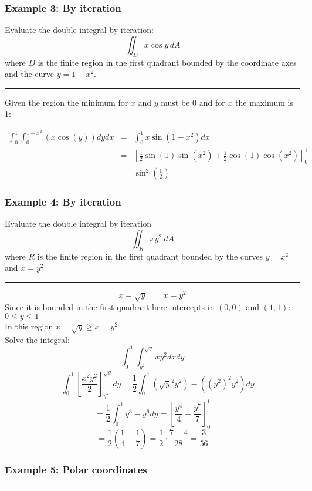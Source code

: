 \subsubsection{Example 3: By iteration}
Evaluate the double integral by iteration:
$$\iint_{D}x\cos y\,d A$$
where $D$ is the finite region in the first quadrant bounded by the coordinate axes and the curve
$y=1-x^2$.

\rule{\textwidth}{1pt}

Given the region the minimum for $x$ and $y$ must be $0$ and for $x$ the maximum is 1:

\begin{eqnarray*}
  \int_{0}^{1}\int_{0}^{1-x^2}(x\cos(y))dydx&=&\int_{0}^{1}x \sin \left(1-x^2\right)dx\\
                                            &=&\left[\frac{1}{2} \sin (1) \sin \left(x^2\right)+\frac{1}{2} \cos (1) \cos \left(x^2\right)\right]^1_0\\
                                            &=&\boxed{\sin ^2\left(\frac{1}{2}\right)}
\end{eqnarray*}

\subsubsection{Example 4: By iteration}
Evaluate the double integral by iteration
$$\iint_Rxy^2\ dA$$
where $R$ is the finite region in the first quadrant bounded by the curves $y=x^2$ and $x=y^2$

\rule{\textwidth}{1pt}
$$x=\sqrt{y}\qquad x=y^2$$
Since it is bounded in the first quadrant here intercepts in $(0,0)$ and $(1,1)$: $0\leq y\leq 1$\\
In this region $x=\sqrt{y}\geq x=y^2$\\
Solve the integral:
$$\int_0^1\int_{y^2}^{\sqrt{y}}xy^2 dxdy$$
$$=\int_0^1 \left[\frac{x^2y^2}{2}\right]_{y^2}^{\sqrt{y}}dy=\frac{1}{2}\int_0^1 (\sqrt{y}^2y^2)-((y^2)^2y^2)dy$$
$$=\frac{1}{2}\int_0^1 y^3-y^6dy=\left[\frac{y^4}{4}-\frac{y^7}{7}\right]_0^1$$
$$=\frac{1}{2}\left(\frac{1}{4}- \frac{1}{7}\right)=\frac{1}{2}\cdot \frac{7-4}{28}=\frac{3}{56}$$
\subsubsection{Example 5: Polar coordinates}

\noindent\rule{\textwidth}{1pt}


